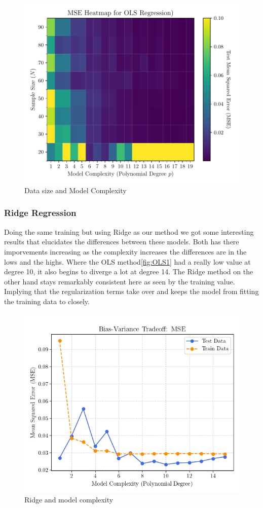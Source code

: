 \documentclass[amssymb,twocolumn,aps]{revtex4}
\begin{document}
\begin{figure}[h]
    \centering
    \includegraphics[width=.95 \linewidth]{Figures/OLS_Heatmap.pdf}
    \caption{Data size and Model Complexity}
    \label{fig:OLSHeat}
\end{figure}

\subsubsection{Ridge Regression}
Doing the same training but using Ridge as our method we got some interesting results that elucidates the differences between these models.
Both has there imporvements increasing as the complexity increases the differences are in the lows and the highs.
Where the OLS method\ref{fig:OLS1} had a really low value at degree 10, it also begins to diverge a lot at degree 14.
The Ridge method on the other hand stays remarkably consistent here as seen by the training value. 
Implying that the regularization terms take over and keeps the model from fitting the training data to closely. 

\begin{figure}[h]
    \centering
    \includegraphics[width=.95 \linewidth]{Figures/MSE_RidgeOnly.png}
    \caption{Ridge and model complexity}
    \label{fig:RidgeMse}
\end{figure}
\end{document}

